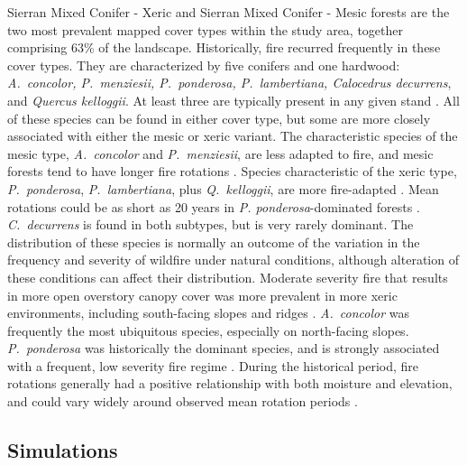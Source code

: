 Sierran Mixed Conifer - Xeric and Sierran Mixed Conifer - Mesic forests are the two most prevalent mapped cover types within the study area, together comprising 63\% of the landscape. Historically, fire recurred frequently in these cover types. They are characterized by five conifers and one hardwood: \emph{A.~concolor, P.~menziesii, P.~ponderosa, P.~lambertiana, Calocedrus decurrens}, and \emph{Quercus kelloggii}. At least three are typically present in any given stand \citep{Landfire2007}. All of these species can be found in either cover type, but some are more closely associated with either the mesic or xeric variant. The characteristic species of the mesic type, \emph{A.~concolor} and \emph{P.~menziesii}, are less adapted to fire, and mesic forests tend to have longer fire rotations \citep{Mallek2013}. Species characteristic of the xeric type, \emph{P.~ponderosa}, \emph{P.~lambertiana}, plus \emph{Q.~kelloggii}, are more fire-adapted \citep{Landfire2007}. Mean rotations could be as short as 20 years in \emph{P. ponderosa}-dominated forests \citep{Mallek2013}. \emph{C.~decurrens} is found in both subtypes, but is very rarely dominant. The distribution of these species is normally an outcome of the variation in the frequency and severity of wildfire under natural conditions, although alteration of these conditions can affect their distribution. Moderate severity fire that results in more open overstory canopy cover was more prevalent in more xeric environments, including south-facing slopes and ridges \citep{SNEP1996a,SNEP1996,Mallek2013,Safford2014}. \emph{A.~concolor} was frequently the most ubiquitous species, especially on north-facing slopes. \emph{P.~ponderosa} was historically the dominant species, and is strongly associated with a frequent, low severity fire regime \citep{WHR1988,Landfire2007}. During the historical period, fire rotations generally had a positive relationship with both moisture and elevation, and could vary widely around observed mean rotation periods \citep{Mallek2013}. 



\subsection{Simulations}

